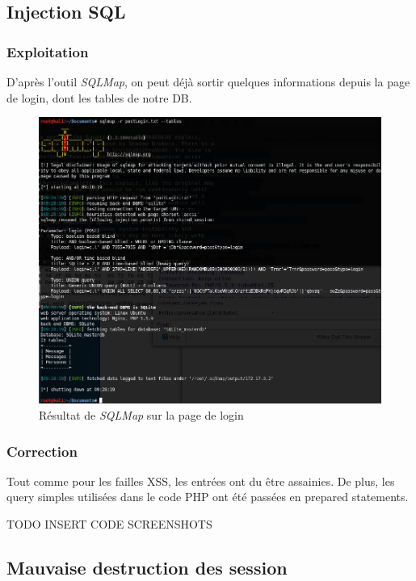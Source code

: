 \documentclass[12pt]{article}
\begin{document}
\subsection{Injection SQL}
\subsubsection{Exploitation}
D'après l'outil \textit{SQLMap}, on peut déjà sortir quelques informations depuis la page de login, dont les tables de notre DB. 

\begin{figure}[H]
\centering
\includegraphics[width=\linewidth]{images/sqli.png}
\caption{Résultat de \textit{SQLMap} sur la page de login}
\end{figure}

\subsubsection{Correction}
Tout comme pour les failles XSS, les entrées ont du être assainies. De plus, les query simples utilisées dans le code PHP ont été passées en prepared statements.

TODO INSERT CODE SCREENSHOTS

\subsection{Mauvaise destruction des session}
\end{document}
